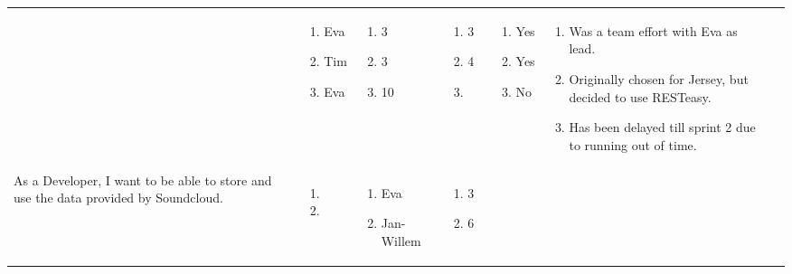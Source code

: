 \documentclass[11pt,a4paper,landscape]{article}
\begin{document}
\begin{table}[h]
\begin{tabular}{|p{5cm}|p{1.0cm}|p{2.5cm}|p{1.8cm}|p{1.8cm}|p{1.0cm}|p{12cm}}
& 
\begin{enumerate}[leftmargin=0.1cm,itemindent=0.1cm]
\item[] Eva 
\item[] Tim
\item[] Eva 
\end{enumerate}

& 
\begin{enumerate}[leftmargin=0.1cm,itemindent=0.1cm]
\item[] 3 
\item[] 3 
\item[] 10 
\end{enumerate}

&
\begin{enumerate}[leftmargin=0.1cm,itemindent=0.1cm]
\item[] 3 
\item[] 4 
\item[]
\end{enumerate}

&
\begin{enumerate}[leftmargin=0.1cm,itemindent=0.1cm]
\item[] Yes
\item[] Yes
\item[] No
\end{enumerate}

&
\begin{enumerate}[leftmargin=0.5cm,itemindent=0.1cm]
\item Was a team effort with Eva as lead.
\item Originally chosen for Jersey, but decided to use RESTeasy.
\item Has been delayed till sprint 2 due to running out of time.
\end{enumerate}
\\
As a Developer, I want to be able to store and use the data provided by Soundcloud. & \begin{enumerate}[leftmargin=0.3cm,itemindent=0.1cm]
\item 
\item
\end{enumerate}

& 
\begin{enumerate}[leftmargin=0.1cm,itemindent=0.1cm]
\item[] Eva 
\item[] Jan-Willem 
\end{enumerate}

& 
\begin{enumerate}[leftmargin=0.1cm,itemindent=0.1cm]
\item[] 3 
\item[] 6 
\end{enumerate}


\end{tabular}
\end{table}
\end{document}
